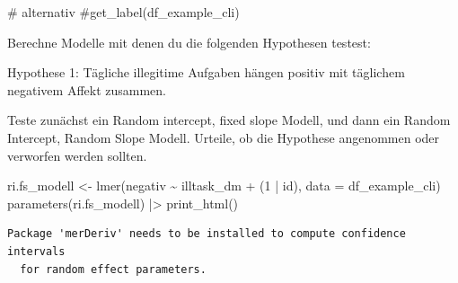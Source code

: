 \documentclass[
  letterpaper,
  DIV=11,
  numbers=noendperiod]{scrreprt}
\newenvironment{Shaded}{\begin{snugshade}}{\end{snugshade}}
\newcommand{\AttributeTok}[1]{\textcolor[rgb]{0.40,0.45,0.13}{#1}}
\newcommand{\CommentTok}[1]{\textcolor[rgb]{0.37,0.37,0.37}{#1}}
\newcommand{\DecValTok}[1]{\textcolor[rgb]{0.68,0.00,0.00}{#1}}
\newcommand{\FunctionTok}[1]{\textcolor[rgb]{0.28,0.35,0.67}{#1}}
\newcommand{\NormalTok}[1]{\textcolor[rgb]{0.00,0.23,0.31}{#1}}
\newcommand{\OtherTok}[1]{\textcolor[rgb]{0.00,0.23,0.31}{#1}}
\newcommand{\SpecialCharTok}[1]{\textcolor[rgb]{0.37,0.37,0.37}{#1}}
\begin{document}
\begin{Shaded}
\begin{Highlighting}[]
\CommentTok{\# alternativ}
\CommentTok{\#get\_label(df\_example\_cli)}
\end{Highlighting}
\end{Shaded}

Berechne Modelle mit denen du die folgenden Hypothesen testest:

Hypothese 1: Tägliche illegitime Aufgaben hängen positiv mit täglichem
negativem Affekt zusammen.

Teste zunächst ein Random intercept, fixed slope Modell, und dann ein
Random Intercept, Random Slope Modell. Urteile, ob die Hypothese
angenommen oder verworfen werden sollten.

\begin{tcolorbox}[enhanced jigsaw, toprule=.15mm, breakable, arc=.35mm, opacitybacktitle=0.6, titlerule=0mm, rightrule=.15mm, title=\textcolor{quarto-callout-tip-color}{\faLightbulb}\hspace{0.5em}{Lösung}, colbacktitle=quarto-callout-tip-color!10!white, coltitle=black, bottomrule=.15mm, colframe=quarto-callout-tip-color-frame, bottomtitle=1mm, toptitle=1mm, leftrule=.75mm, left=2mm, opacityback=0, colback=white]

\begin{Shaded}
\begin{Highlighting}[]
\NormalTok{ri.fs\_modell }\OtherTok{\textless{}{-}} \FunctionTok{lmer}\NormalTok{(negativ }\SpecialCharTok{\textasciitilde{}}\NormalTok{ illtask\_dm }\SpecialCharTok{+}\NormalTok{ (}\DecValTok{1} \SpecialCharTok{|}\NormalTok{ id), }\AttributeTok{data =}\NormalTok{ df\_example\_cli)}
\FunctionTok{parameters}\NormalTok{(ri.fs\_modell) }\SpecialCharTok{|\textgreater{}} \FunctionTok{print\_html}\NormalTok{()}
\end{Highlighting}
\end{Shaded}

\begin{verbatim}
Package 'merDeriv' needs to be installed to compute confidence intervals
  for random effect parameters.
\end{verbatim}


\end{tcolorbox}
\end{document}
